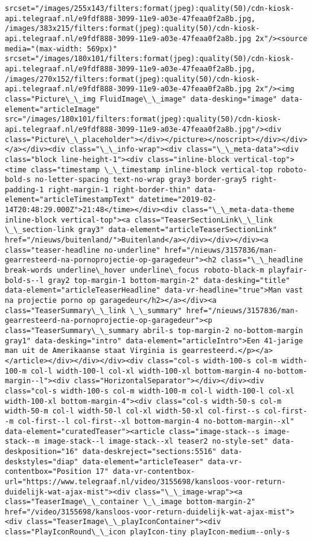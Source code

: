 \documentclass[11pt]{article}
\begin{document}
\begin{Verbatim}[commandchars=\\\{\}]
srcset="/images/255x143/filters:format(jpeg):quality(50)/cdn-kiosk-api.telegraaf.nl/e9fdf888-3099-11e9-a03e-47feaa0f2a8b.jpg, /images/383x215/filters:format(jpeg):quality(50)/cdn-kiosk-api.telegraaf.nl/e9fdf888-3099-11e9-a03e-47feaa0f2a8b.jpg 2x"/><source media="(max-width: 569px)" srcset="/images/180x101/filters:format(jpeg):quality(50)/cdn-kiosk-api.telegraaf.nl/e9fdf888-3099-11e9-a03e-47feaa0f2a8b.jpg, /images/270x152/filters:format(jpeg):quality(50)/cdn-kiosk-api.telegraaf.nl/e9fdf888-3099-11e9-a03e-47feaa0f2a8b.jpg 2x"/><img class="Picture\_\_img FluidImage\_\_image" data-desking="image" data-element="articleImage" src="/images/180x101/filters:format(jpeg):quality(50)/cdn-kiosk-api.telegraaf.nl/e9fdf888-3099-11e9-a03e-47feaa0f2a8b.jpg"/><div class="Picture\_\_placeholder"></div></picture></noscript></div></div></a></div><div class="\_\_info-wrap"><div class="\_\_meta-data"><div class="block line-height-1"><div class="inline-block vertical-top"><time class="timestamp \_\_timestamp inline-block vertical-top roboto-bold-s no-letter-spacing text-no-wrap gray3 border-gray5 right-padding-1 right-margin-1 right-border-thin" data-element="articleTimestampText" datetime="2019-02-14T20:48:29.000Z">21:48</time></div><div class="\_\_meta-data-theme inline-block vertical-top"><a class="TeaserSectionLink\_\_link \_\_section-link gray3" data-element="articleTeaserSectionLink" href="/nieuws/buitenland/">Buitenland</a></div></div></div><a class="teaser-headline no-underline" href="/nieuws/3157836/man-gearresteerd-na-pornoprojectie-op-garagedeur"><h2 class="\_\_headline break-words underline\_hover underline\_focus roboto-black-m playfair-bold-s--l gray2 top-margin-1 bottom-margin-2" data-desking="title" data-element="articleTeaserHeadline" data-vr-headline="true">Man vast na projectie porno op garagedeur</h2></a></div><a class="TeaserSummary\_\_link \_\_summary" href="/nieuws/3157836/man-gearresteerd-na-pornoprojectie-op-garagedeur"><p class="TeaserSummary\_\_summary abril-s top-margin-2 no-bottom-margin gray1" data-desking="intro" data-element="articleIntro">Een 41-jarige man uit de Amerikaanse staat Virginia is gearresteerd.</p></a></article></div></div></div><div class="col-s width-100-s col-m width-100-m col-l width-100-l col-xl width-100-xl bottom-margin-4 no-bottom-margin--l"><div class="HorizontalSeparator"></div></div><div class="col-s width-100-s col-m width-100-m col-l width-100-l col-xl width-100-xl bottom-margin-4"><div class="col-s width-50-s col-m width-50-m col-l width-50-l col-xl width-50-xl col-first--s col-first--m col-first--l col-first--xl bottom-margin-4 no-bottom-margin--xl" data-element="curatedTeaser"><article class="image-stack--s image-stack--m image-stack--l image-stack--xl teaser2 no-style-set" data-deskposition="16" data-deskreject="sections:5516" data-deskstyles="diap" data-element="articleTeaser" data-vr-contentbox="Position 17" data-vr-contentbox-url="https://www.telegraaf.nl/video/3155698/kansloos-voor-return-duidelijk-wat-ajax-mist"><div class="\_\_image-wrap"><a class="TeaserImage\_\_container \_\_image bottom-margin-2" href="/video/3155698/kansloos-voor-return-duidelijk-wat-ajax-mist"><div class="TeaserImage\_\_playIconContainer"><div class="PlayIconRound\_\_icon playIcon-tiny playIcon-medium--only-s 
\end{Verbatim}
\end{document}
